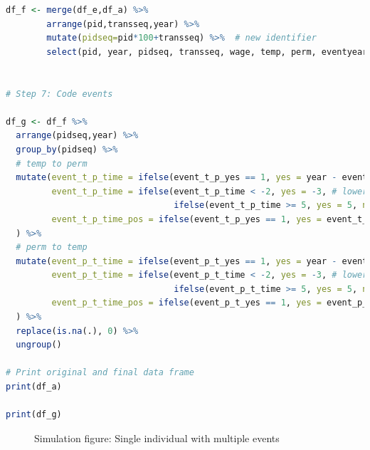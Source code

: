 \begin{lstlisting}[language=R]
df_f <- merge(df_e,df_a) %>%
        arrange(pid,transseq,year) %>%
        mutate(pidseq=pid*100+transseq) %>%  # new identifier
        select(pid, year, pidseq, transseq, wage, temp, perm, eventyear, eventtime, everything())


# Step 7: Code events

df_g <- df_f %>%
  arrange(pidseq,year) %>%
  group_by(pidseq) %>%
  # temp to perm
  mutate(event_t_p_time = ifelse(event_t_p_yes == 1, yes = year - eventyear, no = 0),
         event_t_p_time = ifelse(event_t_p_time < -2, yes = -3, # lower bound
                                 ifelse(event_t_p_time >= 5, yes = 5, no = event_t_p_time)), # upper bound
         event_t_p_time_pos = ifelse(event_t_p_yes == 1, yes = event_t_p_time + 3, no = 0), # make positive
  ) %>%
  # perm to temp
  mutate(event_p_t_time = ifelse(event_p_t_yes == 1, yes = year - eventyear, no = 0),
         event_p_t_time = ifelse(event_p_t_time < -2, yes = -3, # lower bound
                                 ifelse(event_p_t_time >= 5, yes = 5, no = event_p_t_time)), # upper bound
         event_p_t_time_pos = ifelse(event_p_t_yes == 1, yes = event_p_t_time + 3, no = 0), # make positive
  ) %>%
  replace(is.na(.), 0) %>% 
  ungroup()

# Print original and final data frame
print(df_a)

print(df_g)
\end{lstlisting}


\clearpage

\begin{figure}
    \caption{Simulation figure: Single individual with multiple events}
    \label{graph_compare_transformed_data}
\end{figure}


